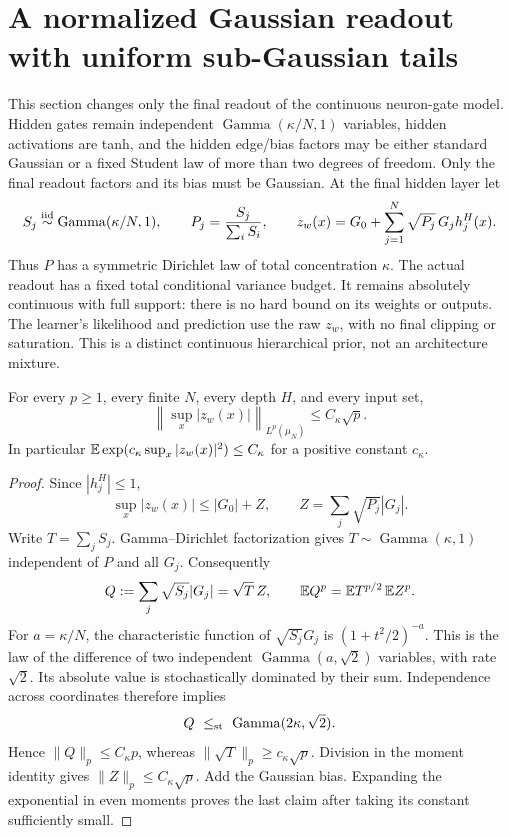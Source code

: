 \section{A normalized Gaussian readout with uniform sub-Gaussian tails}
\label{sec:Dirichlet-readout}
This section changes only the final readout of the continuous neuron-gate model. Hidden gates remain independent $\operatorname{Gamma}(\kappa/N,1)$ variables, hidden activations are tanh, and the hidden edge/bias factors may be either standard Gaussian or a fixed Student law of more than two degrees of freedom. Only the final readout factors and its bias must be Gaussian. At the final hidden layer let
\begin{equation}
 S_j\stackrel{\rm iid}{\sim}\operatorname{Gamma}(\kappa/N,1),
 \qquad P_j=\frac{S_j}{\sum_iS_i},
 \qquad z_w(x)=G_0+\sum_{j=1}^N\sqrt{P_j}\,G_jh_j^H(x).
 \label{eq:Dirichlet-readout-model}
\end{equation}
Thus $P$ has a symmetric Dirichlet law of total concentration $\kappa$. The actual readout has a fixed total conditional variance budget. It remains absolutely continuous with full support: there is no hard bound on its weights or outputs. The learner's likelihood and prediction use the raw $z_w$, with no final clipping or saturation. This is a distinct continuous hierarchical prior, not an architecture mixture.

\begin{lemma}\label{lem:Dirichlet-raw-moment}
For every $p\ge1$, every finite $N$, every depth $H$, and every input set,
\[
 \left\|\sup_x|z_w(x)|\right\|_{L^p(\mu_N)}\le C_\kappa\sqrt p.
\]
In particular $\mathbb E\exp(c_\kappa\sup_x|z_w(x)|^2)\le C_\kappa$ for a positive constant $c_\kappa$.
\end{lemma}
\begin{proof}
Since $|h_j^H|\le1$,
\[
 \sup_x|z_w(x)|\le|G_0|+Z,
 \qquad Z=\sum_j\sqrt{P_j}|G_j|.
\]
Write $T=\sum_jS_j$. Gamma--Dirichlet factorization gives
$T\sim\operatorname{Gamma}(\kappa,1)$ independent of $P$ and all $G_j$.
Consequently
\[
 Q:=\sum_j\sqrt{S_j}|G_j|=\sqrt T\,Z,
 \qquad \mathbb E Q^p=\mathbb E T^{p/2}\,\mathbb E Z^p.
\]
For $a=\kappa/N$, the characteristic function of $\sqrt{S_j}G_j$ is
$(1+t^2/2)^{-a}$. This is the law of the difference of two independent
$\operatorname{Gamma}(a,\sqrt2)$ variables, with rate $\sqrt2$.
Its absolute value is stochastically dominated by their sum. Independence across coordinates therefore implies
\[
 Q\ \le_{\rm st}\ \operatorname{Gamma}(2\kappa,\sqrt2).
\]
Hence $\|Q\|_p\le C_\kappa p$, whereas
$\|\sqrt T\|_p\ge c_\kappa\sqrt p$. Division in the moment identity gives
$\|Z\|_p\le C_\kappa\sqrt p$. Add the Gaussian bias. Expanding the exponential in even moments proves the last claim after taking its constant sufficiently small.
\end{proof}

